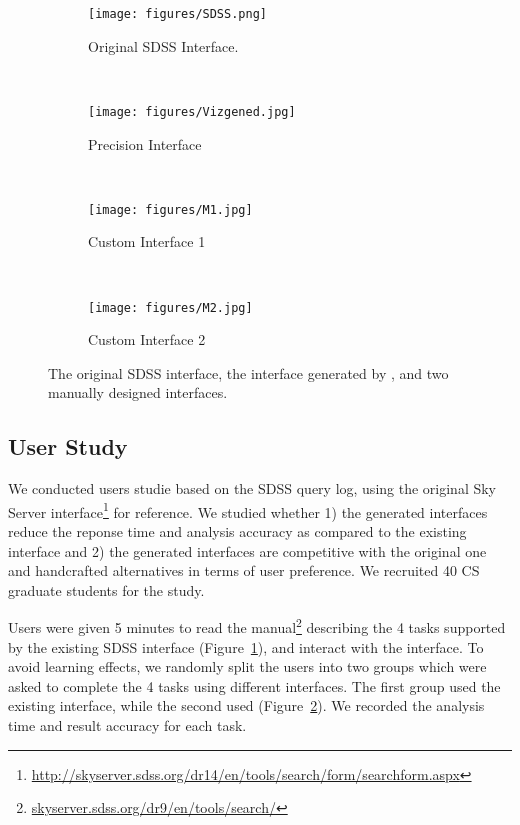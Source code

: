 \begin{figure*}[t!]
    \centering
  \begin{subfigure}[b]{0.28\textwidth}
	    \texttt{[image: figures/SDSS.png]}
	    \caption{Original SDSS Interface.}
	    \label{fig:ui-1}
	\end{subfigure}
	~
  \begin{subfigure}[b]{0.18\textwidth}
	    \texttt{[image: figures/Vizgened.jpg]}
	    \caption{Precision Interface}
	    \label{fig:ui-2}
    \end{subfigure}
	~
  \begin{subfigure}[b]{0.18\textwidth}
	    \texttt{[image: figures/M1.jpg]}
	    \caption{Custom Interface 1}
	    \label{fig:ui-3}
  \end{subfigure}
    ~
  \begin{subfigure}[b]{0.28\textwidth}
	    \texttt{[image: figures/M2.jpg]}
	    \caption{Custom Interface 2}
	    \label{fig:ui-4}
  \end{subfigure}
  \caption{The original SDSS interface, the interface generated by \sys, and two manually designed interfaces.}
  \label{fig:allinterfaces}
\end{figure*}

\subsection{User Study}
We conducted users studie based on the SDSS query log, using the original Sky Server interface\footnote{\url{http://skyserver.sdss.org/dr14/en/tools/search/form/searchform.aspx}} for reference. We studied whether 1) the generated interfaces reduce the reponse time and analysis accuracy as compared to the existing interface and 2) the generated interfaces are competitive with the original one and handcrafted alternatives in terms of user preference. We recruited 40 CS graduate students for the study.

 Users were given 5 minutes to read the manual\footnote{\url{skyserver.sdss.org/dr9/en/tools/search/}} describing the 4 tasks supported by the existing SDSS interface (Figure~\ref{fig:ui-1}), and interact with the interface.  To avoid learning effects, we randomly split the users into two groups which were asked to complete the 4 tasks using different interfaces. The first group used the existing interface, while the second used \sys (Figure~\ref{fig:ui-2}). We recorded the analysis time and result accuracy for each task.

